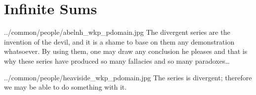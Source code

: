﻿





\chapter{Infinite Sums}


  {../common/people/abelnh_wkp_pdomain.jpg}
  {The divergent series are the invention of the devil, and it is a shame to base on them any demonstration whatsoever.
   By using them, one may draw any conclusion he pleases and that is why these series have produced so many 
   fallacies and so many paradoxes\ldots}

{../common/people/heaviside_wkp_pdomain.jpg}
{The series is divergent; therefore we may be able to do something with it.}


